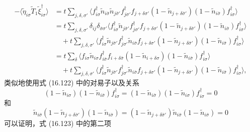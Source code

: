 \begin{align*}
-\langle\tilde{\eta}_{i\sigma}\tilde{T}_{1}\tilde{\xi}_{i\sigma}^{\dagger}\rangle
&=t\sum_{j,\delta,\sigma'}\big\langle f_{i\sigma}^{\dagger}\tilde{n}_{i\bar{\sigma}}\tilde{n}_{j\bar{\sigma}'}f_{j\sigma'}^{\dagger}f_{j+\delta\sigma'}(1-\tilde{n}_{j+\delta\bar{\sigma}'})(1-\tilde{n}_{i\bar{\sigma}})f_{i\sigma}^{\dagger}\big\rangle\\
&=t\sum_{j,\delta,\sigma'}\delta_{ij}\delta_{\bar{\sigma}\sigma'}\big\langle f_{i\sigma}^{\dagger}\tilde{n}_{j\bar{\sigma}'}f_{j\sigma'}^{\dagger}f_{j+\delta\sigma'}(1-\tilde{n}_{j+\delta\bar{\sigma}'})(1-\tilde{n}_{i\bar{\sigma}})f_{i\sigma}^{\dagger}\big\rangle\\
&\quad+t\sum_{j,\delta,\sigma'}\big\langle f_{i\sigma}^{\dagger}\tilde{n}_{j\bar{\sigma}'}f_{j\sigma'}^{\dagger}\tilde{n}_{i\bar{\sigma}}f_{j+\delta\sigma'}(1-\tilde{n}_{j+\delta\bar{\sigma}'})(1-\tilde{n}_{i\bar{\sigma}})f_{i\sigma}^{\dagger}\big\rangle\\
&=t\sum_{\delta}\big\langle f_{i\sigma}\tilde{n}_{i\sigma}f_{i\bar{\sigma}}^{\dagger}f_{i+\delta\bar{\sigma}}(1-\tilde{n}_{i+\delta\sigma})(1-\tilde{n}_{i\bar{\sigma}})f_{i\sigma}^{\dagger}\big\rangle\\
&\quad+t\sum_{j,\delta,\sigma'}\big\langle f_{i\sigma}^{\dagger}\tilde{n}_{j\bar{\sigma}'}f_{j\sigma'}^{\dagger}\tilde{n}_{i\bar{\sigma}}f_{j+\delta\sigma'}(1-\tilde{n}_{j+\delta\bar{\sigma}'})(1-\tilde{n}_{i\bar{\sigma}})f_{i\sigma}^{\dagger}\big\rangle,\tag{16.123}
\end{align*}
类似地使用式 (16.122) 中的对易子以及关系
\begin{equation*}
(1-\tilde{n}_{i\sigma})(1-\tilde{n}_{i\bar{\sigma}})f_{i\sigma}^{\dagger}=(1-\tilde{n}_{i\bar{\sigma}})(1-\tilde{n}_{i\sigma})f_{i\sigma}^{\dagger}=0\tag{16.124}
\end{equation*}
和
\begin{equation*}
\tilde{n}_{i\bar{\sigma}}(1-\tilde{n}_{j+\delta\bar{\sigma}'})(1-\tilde{n}_{i\bar{\sigma}})=(1-\tilde{n}_{j+\delta\bar{\sigma}'})\tilde{n}_{i\bar{\sigma}}(1-\tilde{n}_{i\bar{\sigma}})=0\tag{16.125}
\end{equation*}
可以证明，式 (16.123) 中的第二项
